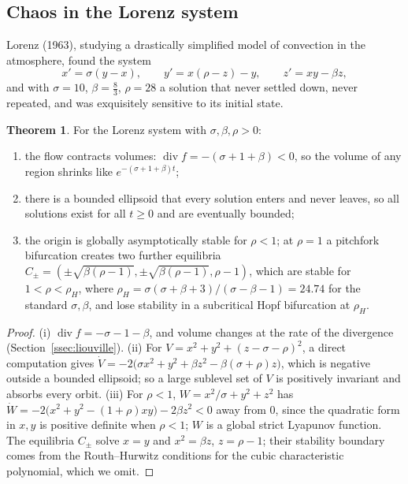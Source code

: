 \documentclass[11pt,a4paper]{article}
\numberwithin{equation}{section}
\theoremstyle{definition}
\newtheorem{thm}{Theorem}[subsection]
\begin{document}
\subsection{Chaos in the Lorenz system}
\label{ssec:lorenz}

Lorenz (1963), studying a drastically simplified model of convection in the atmosphere, found the system
\[
x' = \sigma(y - x), \qquad y' = x(\rho - z) - y, \qquad z' = xy - \beta z ,
\]
and with $\sigma = 10$, $\beta = \frac83$, $\rho = 28$ a solution that never settled down, never repeated, and was exquisitely sensitive to its initial state.

\begin{thm}
\label{thm:lorenz}
For the Lorenz system with $\sigma, \beta, \rho > 0$:
\begin{enumerate}[label=(\roman*)]
\item the flow contracts volumes: $\operatorname{div}f = -(\sigma + 1 + \beta) < 0$, so the volume of any region shrinks like $e^{-(\sigma + 1 + \beta)t}$;
\item there is a bounded ellipsoid that every solution enters and never leaves, so all solutions exist for all $t \geq 0$ and are eventually bounded;
\item the origin is globally asymptotically stable for $\rho < 1$; at $\rho = 1$ a pitchfork bifurcation creates two further equilibria $C_\pm = (\pm\sqrt{\beta(\rho - 1)}, \pm\sqrt{\beta(\rho - 1)}, \rho - 1)$, which are stable for $1 < \rho < \rho_H$,
where $\rho_H = \sigma(\sigma + \beta + 3)/(\sigma - \beta - 1) = 24.74$ for the standard $\sigma, \beta$, and lose stability in a subcritical Hopf bifurcation at $\rho_H$.
\end{enumerate}
\end{thm}

\begin{proof}
(i) $\operatorname{div}f = -\sigma - 1 - \beta$, and volume changes at the rate of the divergence (Section~\ref{ssec:liouville}). (ii) For $V = x^2 + y^2 + (z - \sigma - \rho)^2$, a direct computation gives
$\dot V = -2\bigl(\sigma x^2 + y^2 + \beta z^2 - \beta(\sigma + \rho)z\bigr)$, which is negative outside a bounded ellipsoid; so a large sublevel set of $V$ is positively invariant and absorbs every orbit. (iii) For $\rho < 1$,
$W = x^2/\sigma + y^2 + z^2$ has $\dot W = -2\bigl(x^2 + y^2 - (1 + \rho)xy\bigr) - 2\beta z^2 < 0$ away from $0$, since the quadratic form in $x, y$ is positive definite when $\rho < 1$; $W$ is a global strict Lyapunov function. The equilibria $C_\pm$ solve
$x = y$ and $x^2 = \beta z$, $z = \rho - 1$; their stability boundary comes from the Routh--Hurwitz conditions for the cubic characteristic polynomial, which we omit.
\end{proof}
\end{document}
